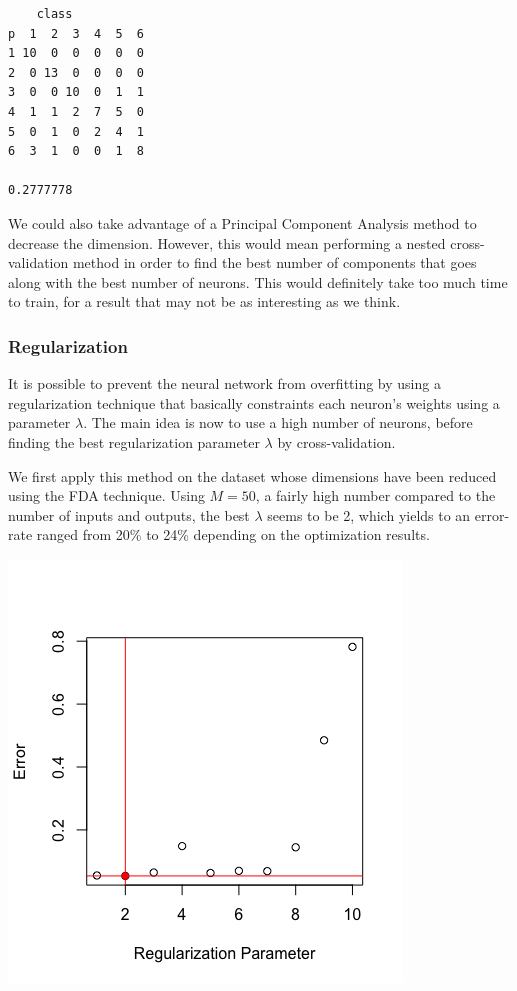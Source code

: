 \documentclass[]{report}
\begin{document}
\begin{verbatim}
    class
p  1  2  3  4  5  6
1 10  0  0  0  0  0
2  0 13  0  0  0  0
3  0  0 10  0  1  1
4  1  1  2  7  5  0
5  0  1  0  2  4  1
6  3  1  0  0  1  8

0.2777778
\end{verbatim}

We could also take advantage of a Principal Component Analysis method to decrease the dimension. However, this would mean performing a nested cross-validation method in order to find the best number of components that goes along with the best number of neurons. This would definitely take too much time to train, for a result that may not be as interesting as we think.

\subsubsection{Regularization}
 It is possible to prevent the neural network from overfitting by using a regularization technique that basically constraints each neuron's weights using a parameter $\lambda$. The main idea is now to use a high number of neurons, before finding the best regularization parameter  $\lambda$ by cross-validation.
 
 We first apply this method on the dataset whose dimensions have been reduced using the FDA technique. Using $M = 50$, a fairly high number compared to the number of inputs and outputs, the best $\lambda$ seems to be 2, which yields to an error-rate ranged from 20\% to 24\% depending on the optimization results.
 
 \begin{center}
 	\includegraphics[width=0.6\linewidth]{Figures/nnet_fda_reg_cv.png}
 	\label{fig:nnet_fda_reg_cv}
 \end{center}
\end{document}
